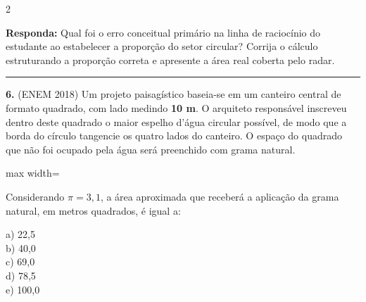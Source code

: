 \documentclass[11pt, a4paper]{article}
\begin{document}
\begin{multicols*}{2}
\begin{boxresponda}
\textbf{Responda:} Qual foi o erro conceitual primário na linha de raciocínio do estudante ao estabelecer a proporção do setor circular? Corrija o cálculo estruturando a proporção correta e apresente a área real coberta pelo radar.
\end{boxresponda}

\vspace{0.4cm}
\noindent\textcolor{CorLinha}{\rule{\linewidth}{0.5pt}} 
\vspace{0.2cm}

\textbf{6.} (ENEM 2018) Um projeto paisagístico baseia-se em um canteiro central de formato quadrado, com lado medindo \textbf{10 m}. O arquiteto responsável inscreveu dentro deste quadrado o maior espelho d'água circular possível, de modo que a borda do círculo tangencie os quatro lados do canteiro. O espaço do quadrado que não foi ocupado pela água será preenchido com grama natural.

\begin{center}
\begin{adjustbox}{max width=\linewidth}
\end{adjustbox}
\end{center}

Considerando $\pi = 3,1$, a área aproximada que receberá a aplicação da grama natural, em metros quadrados, é igual a:

a) 22,5\\[0.3cm]
b) 40,0\\[0.3cm]
c) 69,0\\[0.3cm]
d) 78,5\\[0.3cm]
e) 100,0\\[0.3cm]


\end{multicols*}
\end{document}
